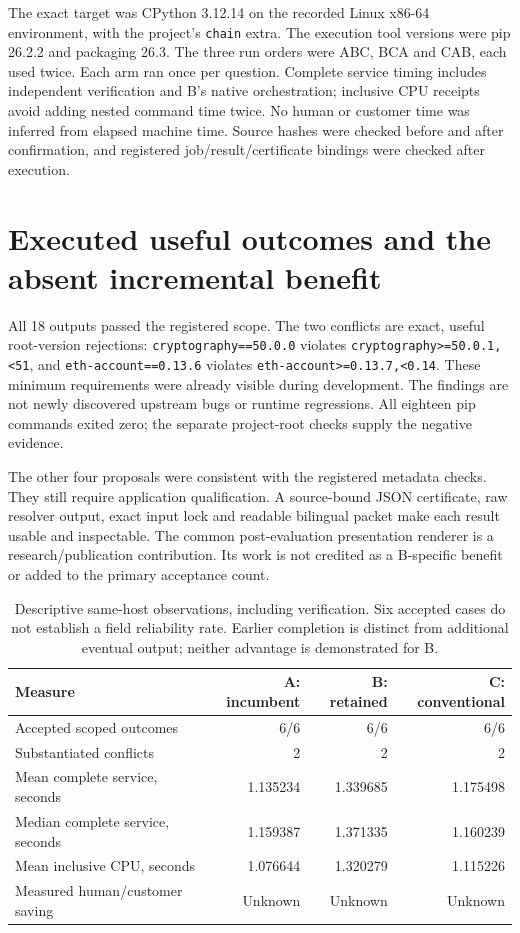 \documentclass[11pt,letterpaper]{article}
\begin{document}
The exact target was CPython 3.12.14 on the recorded Linux x86-64 environment, with the project's \texttt{chain} extra. The execution tool versions were pip 26.2.2 and packaging 26.3. The three run orders were ABC, BCA and CAB, each used twice. Each arm ran once per question. Complete service timing includes independent verification and B's native orchestration; inclusive CPU receipts avoid adding nested command time twice. No human or customer time was inferred from elapsed machine time. Source hashes were checked before and after confirmation, and registered job/result/certificate bindings were checked after execution.

\section{Executed useful outcomes and the absent incremental benefit}

All 18 outputs passed the registered scope. The two conflicts are exact, useful root-version rejections: \texttt{cryptography==50.0.0} violates \texttt{cryptography>=50.0.1,<51}, and \texttt{eth-account==0.13.6} violates \texttt{eth-account>=0.13.7,<0.14}. These minimum requirements were already visible during development. The findings are not newly discovered upstream bugs or runtime regressions. All eighteen pip commands exited zero; the separate project-root checks supply the negative evidence.

The other four proposals were consistent with the registered metadata checks. They still require application qualification. A source-bound JSON certificate, raw resolver output, exact input lock and readable bilingual packet make each result usable and inspectable. The common post-evaluation presentation renderer is a research/publication contribution. Its work is not credited as a B-specific benefit or added to the primary acceptance count.

\begin{table}[htbp]
\centering
\begin{tabular}{@{}lrrr@{}}
\toprule
Measure & A: incumbent & B: retained & C: conventional \\
\midrule
Accepted scoped outcomes & 6/6 & 6/6 & 6/6 \\
Substantiated conflicts & 2 & 2 & 2 \\
Mean complete service, seconds & 1.135234 & 1.339685 & 1.175498 \\
Median complete service, seconds & 1.159387 & 1.371335 & 1.160239 \\
Mean inclusive CPU, seconds & 1.076644 & 1.320279 & 1.115226 \\
Measured human/customer saving & Unknown & Unknown & Unknown \\
\bottomrule
\end{tabular}
\caption{Descriptive same-host observations, including verification. Six accepted cases do not establish a field reliability rate. Earlier completion is distinct from additional eventual output; neither advantage is demonstrated for B.}
\end{table}
\end{document}
